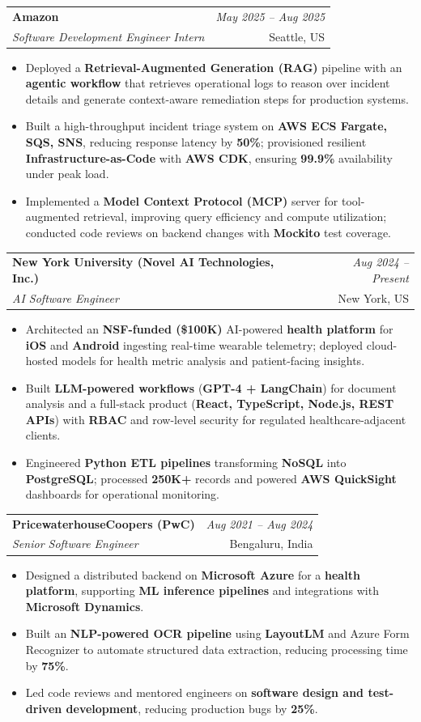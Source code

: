 \documentclass[a4paper,10pt]{article}
\makeatletter
\newcommand{\resumeSubheading}[4]{
\vspace{0.3mm}\item
    \begin{tabular*}{0.98\textwidth}[t]{l@{\extracolsep{\fill}}r}
        \textbf{#1} & \textit{\footnotesize{#4}} \\
        \textit{\footnotesize{#3}} & \footnotesize{#2}\\
    \end{tabular*}\vspace{-2mm}
}
\newcommand{\resumeItemListStart}{\begin{itemize}[leftmargin=*, labelsep=1mm, itemsep=0pt]}
\newcommand{\resumeItemListEnd}{\end{itemize}\vspace{-2mm}}
\makeatother
\begin{document}
\resumeSubheading
{Amazon}{Seattle, US}
{Software Development Engineer Intern}{May 2025 -- Aug 2025}
\resumeItemListStart
\item \footnotesize{Deployed a \textbf{Retrieval-Augmented Generation (RAG)} pipeline with an \textbf{agentic workflow} that retrieves operational logs to reason over incident details and generate context-aware remediation steps for production systems.}
\item \footnotesize{Built a high-throughput incident triage system on \textbf{AWS ECS Fargate, SQS, SNS}, reducing response latency by \textbf{50\%}; provisioned resilient \textbf{Infrastructure-as-Code} with \textbf{AWS CDK}, ensuring \textbf{99.9\%} availability under peak load.}
\item \footnotesize{Implemented a \textbf{Model Context Protocol (MCP)} server for tool-augmented retrieval, improving query efficiency and compute utilization; conducted code reviews on backend changes with \textbf{Mockito} test coverage.}
\resumeItemListEnd

\resumeSubheading
{New York University (Novel AI Technologies, Inc.)}{New York, US}
{AI Software Engineer}{Aug 2024 -- Present}
\resumeItemListStart
\item \footnotesize{Architected an \textbf{NSF-funded (\$100K)} AI-powered \textbf{health platform} for \textbf{iOS} and \textbf{Android} ingesting real-time wearable telemetry; deployed cloud-hosted models for health metric analysis and patient-facing insights.}
\item \footnotesize{Built \textbf{LLM-powered workflows} (\textbf{GPT-4 + LangChain}) for document analysis and a full-stack product (\textbf{React, TypeScript, Node.js, REST APIs}) with \textbf{RBAC} and row-level security for regulated healthcare-adjacent clients.}
\item \footnotesize{Engineered \textbf{Python ETL pipelines} transforming \textbf{NoSQL} into \textbf{PostgreSQL}; processed \textbf{250K+} records and powered \textbf{AWS QuickSight} dashboards for operational monitoring.}
\resumeItemListEnd

\resumeSubheading
{PricewaterhouseCoopers (PwC)}{Bengaluru, India}
{Senior Software Engineer}{Aug 2021 -- Aug 2024}
\resumeItemListStart
\item \footnotesize{Designed a distributed backend on \textbf{Microsoft Azure} for a \textbf{health platform}, supporting \textbf{ML inference pipelines} and integrations with \textbf{Microsoft Dynamics}.}
\item \footnotesize{Built an \textbf{NLP-powered OCR pipeline} using \textbf{LayoutLM} and Azure Form Recognizer to automate structured data extraction, reducing processing time by \textbf{75\%}.}
\item \footnotesize{Led code reviews and mentored engineers on \textbf{software design and test-driven development}, reducing production bugs by \textbf{25\%}.}
\resumeItemListEnd
\end{document}

